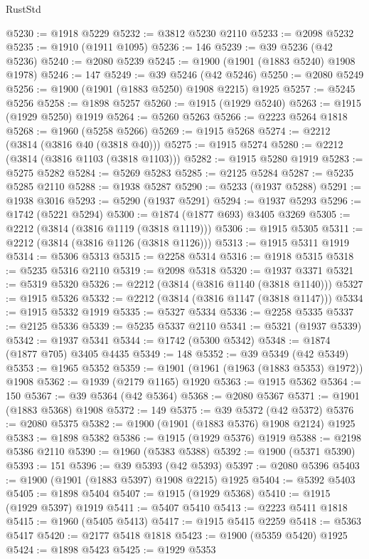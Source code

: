 \begin{lexlean}{RustStd}
\begin{coremodule}
{\begin{coremodule}
{{{{{{{{{{{{{{{{{{{{{{{{{{{{{{{{{{{{{{{{{{{@5230 := @1918 @5229
@5232 := @3812 @5230 @2110
@5233 := @2098 @5232
@5235 := @1910 (@1911 @1095)
@5236 := 146
@5239 := @39 @5236 (@42 @5236)
@5240 := @2080 @5239
@5245 := @1900 (@1901 (@1883 @5240) @1908 @1978)
@5246 := 147
@5249 := @39 @5246 (@42 @5246)
@5250 := @2080 @5249
@5256 := @1900 (@1901 (@1883 @5250) @1908 @2215) @1925
@5257 := @5245 @5256
@5258 := @1898 @5257
@5260 := @1915 (@1929 @5240)
@5263 := @1915 (@1929 @5250) @1919
@5264 := @5260 @5263
@5266 := @2223 @5264 @1818
@5268 := @1960 (@5258 @5266)
@5269 := @1915 @5268
@5274 := @2212 (@3814 (@3816 @40 (@3818 @40)))
@5275 := @1915 @5274
@5280 := @2212 (@3814 (@3816 @1103 (@3818 @1103)))
@5282 := @1915 @5280 @1919
@5283 := @5275 @5282
@5284 := @5269 @5283
@5285 := @2125 @5284
@5287 := @5235 @5285 @2110
@5288 := @1938 @5287
@5290 := @5233 (@1937 @5288)
@5291 := @1938 @3016
@5293 := @5290 (@1937 @5291)
@5294 := @1937 @5293
@5296 := @1742 (@5221 @5294)
@5300 := @1874 (@1877 @693) @3405 @3269
@5305 := @2212 (@3814 (@3816 @1119 (@3818 @1119)))
@5306 := @1915 @5305
@5311 := @2212 (@3814 (@3816 @1126 (@3818 @1126)))
@5313 := @1915 @5311 @1919
@5314 := @5306 @5313
@5315 := @2258 @5314
@5316 := @1918 @5315
@5318 := @5235 @5316 @2110
@5319 := @2098 @5318
@5320 := @1937 @3371
@5321 := @5319 @5320
@5326 := @2212 (@3814 (@3816 @1140 (@3818 @1140)))
@5327 := @1915 @5326
@5332 := @2212 (@3814 (@3816 @1147 (@3818 @1147)))
@5334 := @1915 @5332 @1919
@5335 := @5327 @5334
@5336 := @2258 @5335
@5337 := @2125 @5336
@5339 := @5235 @5337 @2110
@5341 := @5321 (@1937 @5339)
@5342 := @1937 @5341
@5344 := @1742 (@5300 @5342)
@5348 := @1874 (@1877 @705) @3405 @4435
@5349 := 148
@5352 := @39 @5349 (@42 @5349)
@5353 := @1965 @5352
@5359 := @1901 (@1961 (@1963 (@1883 @5353) @1972)) @1908
@5362 := @1939 (@2179 @1165) @1920
@5363 := @1915 @5362
@5364 := 150
@5367 := @39 @5364 (@42 @5364)
@5368 := @2080 @5367
@5371 := @1901 (@1883 @5368) @1908
@5372 := 149
@5375 := @39 @5372 (@42 @5372)
@5376 := @2080 @5375
@5382 := @1900 (@1901 (@1883 @5376) @1908 @2124) @1925
@5383 := @1898 @5382
@5386 := @1915 (@1929 @5376) @1919
@5388 := @2198 @5386 @2110
@5390 := @1960 (@5383 @5388)
@5392 := @1900 (@5371 @5390)
@5393 := 151
@5396 := @39 @5393 (@42 @5393)
@5397 := @2080 @5396
@5403 := @1900 (@1901 (@1883 @5397) @1908 @2215) @1925
@5404 := @5392 @5403
@5405 := @1898 @5404
@5407 := @1915 (@1929 @5368)
@5410 := @1915 (@1929 @5397) @1919
@5411 := @5407 @5410
@5413 := @2223 @5411 @1818
@5415 := @1960 (@5405 @5413)
@5417 := @1915 @5415 @2259
@5418 := @5363 @5417
@5420 := @2177 @5418 @1818
@5423 := @1900 (@5359 @5420) @1925
@5424 := @1898 @5423
@5425 := @1929 @5353
}}}}}}}}}}}}}}}}}}}}}}}}}}}}}}}}}}}}}}}}}}}
\end{coremodule}}
\end{coremodule}
\end{lexlean}
